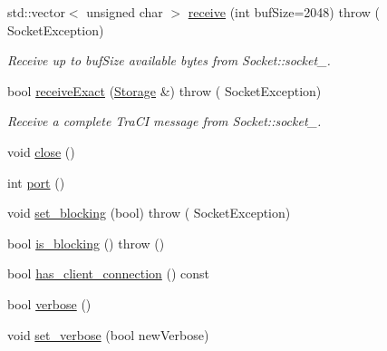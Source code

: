 \begin{DoxyCompactItemize}
\item 
std\+::vector$<$ unsigned char $>$ \hyperlink{classtcpip_1_1_socket_a1da162e961fee9f1a1450df9700fd468}{receive} (int buf\+Size=2048)  throw ( Socket\+Exception)
\begin{DoxyCompactList}\small\item\em Receive up to {\ttfamily buf\+Size} available bytes from Socket\+::socket\+\_\+. \end{DoxyCompactList}\item 
bool \hyperlink{classtcpip_1_1_socket_a0d00337ac1fbad2cf183f0a651539e2e}{receive\+Exact} (\hyperlink{classtcpip_1_1_storage}{Storage} \&)  throw ( Socket\+Exception)
\begin{DoxyCompactList}\small\item\em Receive a complete Tra\+CI message from Socket\+::socket\+\_\+. \end{DoxyCompactList}\item 
void \hyperlink{classtcpip_1_1_socket_adda6f45e2b5fabc7f539f4ddcbe4b144}{close} ()
\item 
int \hyperlink{classtcpip_1_1_socket_ab7e67c84c32557ffb98d940081497d67}{port} ()
\item 
void \hyperlink{classtcpip_1_1_socket_ac382abc174bd18e4a61354cd857470c8}{set\+\_\+blocking} (bool)  throw ( Socket\+Exception)
\item 
bool \hyperlink{classtcpip_1_1_socket_a4a599332c62974235bde84f2145066b4}{is\+\_\+blocking} ()  throw ()
\item 
bool \hyperlink{classtcpip_1_1_socket_a78436cfed4ad686180491c38e88ebfc3}{has\+\_\+client\+\_\+connection} () const
\item 
bool \hyperlink{classtcpip_1_1_socket_a5633dda8e133b4eba9028b4e460b5587}{verbose} ()
\item 
void \hyperlink{classtcpip_1_1_socket_a695b2054effe2dfc2eddb12b7032b723}{set\+\_\+verbose} (bool new\+Verbose)
\end{DoxyCompactItemize}

